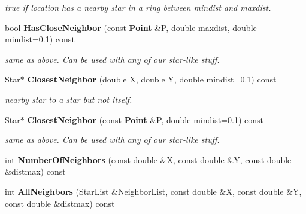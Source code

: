 \begin{CompactItemize}
\begin{CompactList}\small\item\em true if location has a nearby star in a ring between mindist and maxdist.\item\end{CompactList}\item 
{}
bool {\bf Has\-Close\-Neighbor} (const {\bf Point} \&P, double maxdist, double mindist=0.1) const\label{class_starlist_a19}

\begin{CompactList}\small\item\em same as above. Can be used with any of our star-like stuff.\item\end{CompactList}\item 
{}
Star$\ast$ {\bf Closest\-Neighbor} (double X, double Y, double mindist=0.1) const\label{class_starlist_a20}

\begin{CompactList}\small\item\em nearby star to a star but not itself.\item\end{CompactList}\item 
{}
Star$\ast$ {\bf Closest\-Neighbor} (const {\bf Point} \&P, double mindist=0.1) const\label{class_starlist_a21}

\begin{CompactList}\small\item\em same as above. Can be used with any of our star-like stuff.\item\end{CompactList}\item 
{}
int {\bf Number\-Of\-Neighbors} (const double \&X, const double \&Y, const double \&distmax) const\label{class_starlist_a22}

\item 
{}
int {\bf All\-Neighbors} (Star\-List \&Neighbor\-List, const double \&X, const double \&Y, const double \&distmax) const\label{class_starlist_a23}


\end{CompactItemize}
